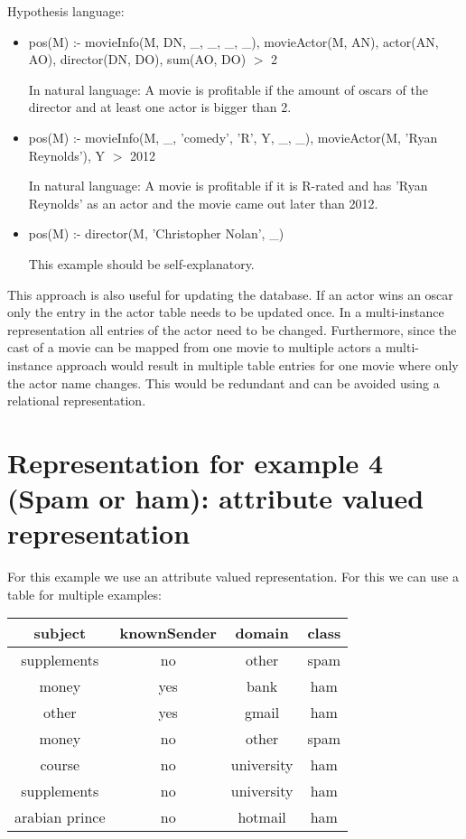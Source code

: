 \documentclass[a4paper]{article}
\begin{document}
\medskip
Hypothesis language:
\begin{itemize}
\item pos(M) :- movieInfo(M, DN, \_, \_, \_, \_), movieActor(M, AN), actor(AN, AO), director(DN, DO), sum(AO, DO) $>$ 2

In natural language: A movie is profitable if the amount of oscars of the director and at least one actor is bigger than 2.

\item pos(M) :- movieInfo(M, \_, 'comedy', 'R', Y, \_, \_), movieActor(M, 'Ryan Reynolds'), Y $>$ 2012

In natural language: A movie is profitable if it is R-rated and has 'Ryan Reynolds' as an actor and the movie came out later than 2012.

\item pos(M) :- director(M, 'Christopher Nolan', \_)

This example should be self-explanatory.
\end{itemize}

This approach is also useful for updating the database. If an actor wins an oscar only the entry in the actor table needs to be updated once. In a multi-instance representation all entries of the actor need to be changed. Furthermore, since the cast of a movie can be mapped from one movie to multiple actors a multi-instance approach would result in multiple table entries for one movie where only the actor name changes. This would be redundant and can be avoided using a relational representation.


\section{Representation for example 4 (Spam or ham): attribute valued representation}
For this example we use an attribute valued representation. For this we can use a table for multiple examples:

\begin{tabular}{|c|c|c||c|}
	\hline
	subject & knownSender & domain & class \\
	\hline
	supplements & no & other & spam \\
	money & yes & bank & ham \\
	other & yes & gmail & ham \\
	money & no & other & spam \\
	course & no & university & ham \\
	supplements & no & university & ham \\
	arabian prince & no & hotmail & ham \\
	\hline
\end{tabular}
\end{document}
